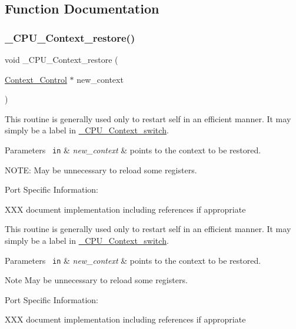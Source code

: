 \subsection{Function Documentation}
\mbox{\label{group__RTEMSScoreCPUlm32Context_ga80726ebfe00f31a88b086cc4474c472f}} 
\subsubsection{\texorpdfstring{\_CPU\_Context\_restore()}{\_CPU\_Context\_restore()}}
{\footnotesize\ttfamily void \+\_\+\+C\+P\+U\+\_\+\+Context\+\_\+restore (\begin{DoxyParamCaption}\item[{\mbox{\hyperlink{structContext__Control}{Context\+\_\+\+Control}} $\ast$}]{new\+\_\+context }\end{DoxyParamCaption})}

This routine is generally used only to restart self in an efficient manner. It may simply be a label in \mbox{\hyperlink{group__RTEMSScoreCPUARM_gaa9f8cc989454b28232e5375e30c90970}{\+\_\+\+C\+P\+U\+\_\+\+Context\+\_\+switch}}.


\begin{DoxyParams}[1]{Parameters}
\mbox{\texttt{ in}}  & {\em new\+\_\+context} & points to the context to be restored.\\
\hline
\end{DoxyParams}
N\+O\+TE\+: May be unnecessary to reload some registers.

Port Specific Information\+:

X\+XX document implementation including references if appropriate

This routine is generally used only to restart self in an efficient manner. It may simply be a label in \mbox{\hyperlink{group__RTEMSScoreCPUARM_gaa9f8cc989454b28232e5375e30c90970}{\+\_\+\+C\+P\+U\+\_\+\+Context\+\_\+switch}}.


\begin{DoxyParams}[1]{Parameters}
\mbox{\texttt{ in}}  & {\em new\+\_\+context} & points to the context to be restored.\\
\hline
\end{DoxyParams}
\begin{DoxyNote}{Note}
May be unnecessary to reload some registers.
\end{DoxyNote}
Port Specific Information\+:

X\+XX document implementation including references if appropriate 